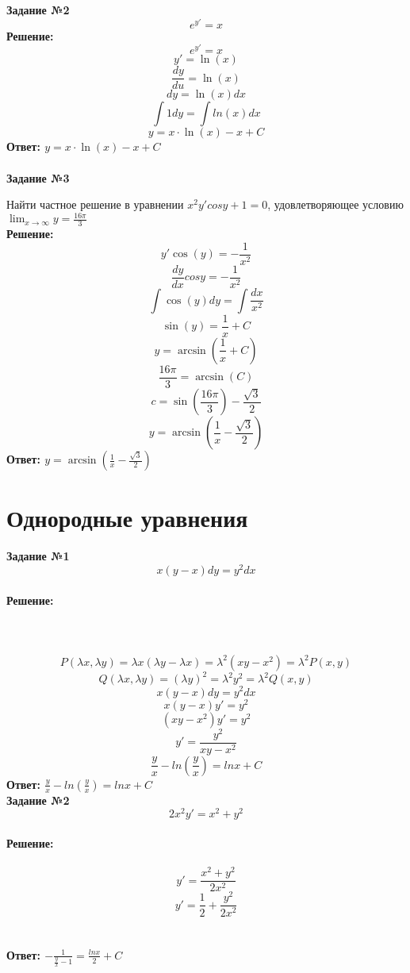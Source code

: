 \documentclass{article}
\begin{document}
\textbf{Задание №2}
$$e^{y'} = x$$
\textbf{Решение:}
$$e^{y'} = x$$
$$y' = \ln(x)$$
$$\frac{dy}{du} = \ln(x)$$
$$dy = \ln(x)dx$$
$$\int1dy = \int ln(x)dx$$
$$y = x \cdot \ln(x) - x + C$$
\textbf{Ответ: $y = x \cdot \ln(x) - x + C$}\\\\

\textbf{Задание №3}
\par{Найти частное решение в уравнении $x^2y'cosy + 1 = 0$, удовлетворяющее условию $\lim_{x\to\infty}{y} = \frac{16\pi}{3}$}\\
\textbf{Решение:}
$$y'\cos(y) = -\frac{1}{x^2}$$
$$\frac{dy}{dx}cosy = -\frac{1}{x^2}$$
$$\int \cos(y)dy = \int\frac{dx}{x^2}$$
$$\sin(y) = \frac{1}{x} + C$$
$$y = \arcsin(\frac{1}{x} + C)$$
$$\frac{16\pi}{3} = \arcsin(C)$$
$$c = \sin(\frac{16\pi}{3}) - \frac{\sqrt{3}}{2}$$
$$y = \arcsin(\frac{1}{x} - \frac{\sqrt{3}}{2})$$
\textbf{Ответ: $y = \arcsin(\frac{1}{x} - \frac{\sqrt{3}}{2})$}

\section{Однородные уравнения}
\textbf{Задание №1}
$$x(y-x)dy = y^{2}dx$$\\
\textbf{Решение:}\\\\
\text{]$x(y-x)$ = P(x, y), $y^2$ = Q(x, y)}\\\\
$$P(\lambda x, \lambda y) = \lambda x (\lambda y - \lambda x) = \lambda^2 (xy - x^2) = \lambda^2 P(x, y)$$
$$Q(\lambda x, \lambda y) = (\lambda y)^2 = \lambda^2y^2 = \lambda^2 Q(x, y)$$
$$x(y - x)dy = y^2dx$$
$$x(y-x)y' = y^2$$
$$(xy - x^2)y' = y^2$$
$$y' = \frac{y^2}{xy - x^2}$$
\text{]$y = ux$, $u = \frac{y}{x}$, $y' = u'x + u$: 
$$u'x + u = \frac{u^2}{u - 1}$$
$$\frac{du}{dx}x + u = \frac{u^2}{u - 1}$$
$$\frac{(u - 1)du}{u} = \frac{dx}{x}$$
$$\int\frac{u-1}{u}du = \int\frac{1}{x}dx$$
$$u - ln|u| = ln|x| + C$$}
$$\frac{y}{x} - ln(\frac{y}{x}) = lnx + C$$
\textbf{Ответ: $\frac{y}{x} - ln(\frac{y}{x}) = lnx + C$}\\

\textbf{Задание №2}
$$2x^2y' = x^2 + y^2$$\\
\textbf{Решение:}\\\\
$$y' = \frac{x^2 + y^2}{2x^2}$$
$$y' = \frac{1}{2} + \frac{y^2}{2x^2}$$
\text{]$y = ux$, $u = \frac{y}{x}$, $y' = u'x + u$:
$$u'x + u = \frac{1}{2} + \frac{1}{2}u^2$$
$$u'x = \frac{u^2 - 2u + 1}{2}$$
$$u' = \frac{u^2 - 2u + 1}{2x}$$
$$\frac{du}{(u^2 - 2u + 1)dx} = \frac{1}{2x}$$
$$\frac{du}{u^2 - 2u + 1} = \frac{dx}{2x}$$
$$\int\frac{du}{u^2 - 2u + 1} = \int\frac{dx}{2x}$$
$$\int\frac{du}{(u- 1)^2} = \frac{1}{2} \int\frac{dx}{x}$$
$$\frac{du}{t^2} = \frac{ln|x|}{2} + C$$
$$-\frac{1}{t} = \frac{ln|x|}{2} + C$$
$$-\frac{1}{u - 1} = \frac{ln|x|}{2} + C$$
$$-\frac{1}{\frac{y}{x} - 1} = \frac{lnx}{2} + C$$}\\\\
\textbf{Ответ: $-\frac{1}{\frac{y}{x} - 1} = \frac{lnx}{2} + C$}\\\\
\end{document}
